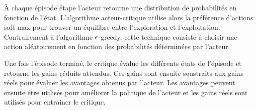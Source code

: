 À chaque épisode étape l'acteur retourne une distribution de probabilités en fonction de l'état.
L'algorithme acteur-critique utilise alors la préférence d'actions soft-max pour trouver un équilibre entre l'exploration et l'exploitation. 
Contrairement à l'algorithme $\large\epsilon$-greedy, cette technique consiste à choisir une action aléatoirement en fonction des probabilités déterminées par l'acteur. \cite{BartoSutton}

Une fois l'épisode terminé, le critique évalue les différents états de l'épisode et retourne les gains réduits attendus.
Ces gains sont ensuite soustraits aux gains réels pour évaluer les avantages obtenus par l'acteur.
Les avantages peuvent ensuite être utilisés pour améliorer la politique de l'acteur et les gains réels sont utilisés pour 
entrainer le critique.

